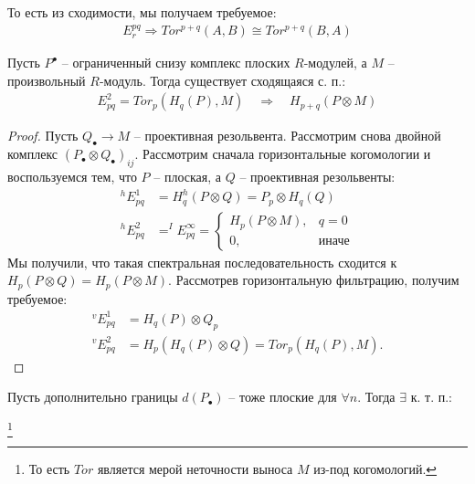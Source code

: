 \documentclass[../main.tex]{subfiles}
\begin{document}
То есть из сходимости, мы получаем требуемое:
\begin{align*}
E_r^{pq} \Rightarrow Tor^{p+q}(A, B) \cong Tor^{p+q}(B, A)
\end{align*}
\begin{to_suj}
Пусть $P^{\bullet}$ -- ограниченный снизу комплекс плоских $R$-модулей, а $M$ -- произвольный $R$-модуль. Тогда существует сходящаяся с. п.:
\begin{align*}
    E_{pq}^2 = Tor_p(H_q(P),M)\quad \Rightarrow \quad H_{p+q}(P \otimes M)
\end{align*}
\end{to_suj}
\begin{proof}
Пусть $Q_\bullet \to M$ -- проективная резольвента. Рассмотрим снова двойной комплекс $(P_\bullet\otimes Q_\bullet)_{ij}$. Рассмотрим сначала горизонтальные когомологии и воспользуемся тем, что $P$ -- плоская, а $Q$ -- проективная резольвенты:
\begin{align*}
^{h}E_{pq}^1&=H_q^{h}(P\otimes Q) = P_p\otimes H_q(Q)\\
^{h}E_{pq}^2&=^{I}E_{pq}^{\infty} =\begin{cases} H_p(P\otimes M), & q = 0\\ 0, & \text{иначе}\end{cases}
\end{align*}
Мы получили, что такая спектральная последовательность сходится к $H_p(P\otimes Q) = H_p( P\otimes M)$. Рассмотрев горизонтальную фильтрацию, получим требуемое:
\begin{align*}
^{v}E_{pq}^1&= H_q(P)\otimes Q_p\\
^{v}E_{pq}^2&= H_p(H_q(P)\otimes Q) =Tor_p(H_q (P), M).
\end{align*}
\end{proof}
\begin{to_suj}
Пусть дополнительно границы $d(P_\bullet)$ -- тоже плоские для $\forall n$. 
Тогда $\exists$ к. т. п.:
\bee
{}
\eee\footnote{То есть $Tor$ является мерой неточности выноса $M$ из-под когомологий.}
\end{to_suj}
\end{document}
